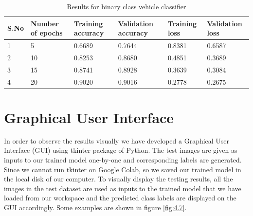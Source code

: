 \begin{table}[H]
    \caption{Results for binary class vehicle classifier}
    \label{table:4.2}
	  \begin{center}
		\scalebox{0.85}
		{\begin{tabular}{|l |l |l |l |l |l |}
		\hline
		S.No & Number of epochs & Training accuracy & Validation accuracy & Training loss & Validation loss\\ \hline
		1  & 5 & 0.6689 & 0.7644 & 0.8381 & 0.6587
		\\ \hline
		2  & 10 & 0.8253 & 0.8680 & 0.4851 & 0.3689
        \\ \hline %
        3   & 15 &  0.8741 & 0.8928  &0.3639  & 0.3084
        \\ \hline %
        4   & 20 &  0.9020 & 0.9016  &0.2778  & 0.2675
        \\ \hline %
		\end{tabular}}
	  \end{center}
\end{table}

\section{Graphical User Interface}
In order to observe the results visually we have developed a Graphical User
Interface (GUI) using tkinter package of 
Python. The test images are given as inputs to our trained
model one-by-one and corresponding labels are generated.
Since we cannot run tkinter on Google Colab,
so we saved our trained model in the local disk of our computer.
To visually display the testing results, all the images in the test dataset are used as inputs to the trained model that we have loaded  from our workspace
and the predicted class labels are displayed on the GUI accordingly.
Some examples are shown in
figure \ref{fig:4.7}.

